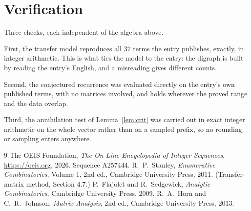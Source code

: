 \documentclass[11pt,a4paper]{article}
\theoremstyle{plain}
\theoremstyle{definition}
\begin{document}
\section{Verification}

Three checks, each independent of the algebra above.

First, the transfer model reproduces all $37$ terms the entry publishes, exactly, in
integer arithmetic. This is what ties the model to the entry: the digraph is built by reading
the entry's English, and a misreading gives different counts.

Second, the conjectured recurrence was evaluated directly on the entry's own published terms,
with no matrices involved, and holds wherever the proved range and the data overlap.

Third, the annihilation test of Lemma~\ref{lem:crit} was carried out in exact integer
arithmetic on the whole vector rather than on a sampled prefix, so no rounding or sampling
enters anywhere.

\begin{thebibliography}{9}
 The OEIS Foundation, \emph{The On-Line Encyclopedia of Integer
Sequences}, \url{https://oeis.org}, 2026. Sequence A257444.
 R.~P.~Stanley, \emph{Enumerative Combinatorics}, Volume 1, 2nd ed.,
Cambridge University Press, 2011. (Transfer-matrix method, Section 4.7.)
 P.~Flajolet and R.~Sedgewick, \emph{Analytic Combinatorics}, Cambridge
University Press, 2009.
 R.~A.~Horn and C.~R.~Johnson, \emph{Matrix Analysis}, 2nd ed., Cambridge
University Press, 2013.
\end{thebibliography}
\end{document}
